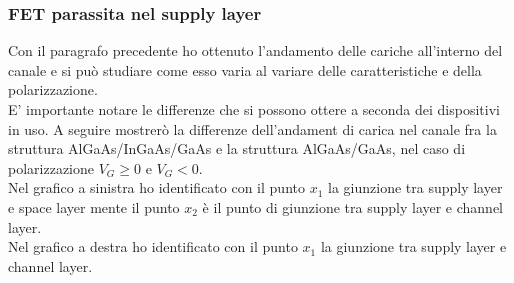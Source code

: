 \subsubsection{FET parassita nel supply layer}
Con il paragrafo precedente ho ottenuto l'andamento delle cariche all'interno del canale e si può studiare come esso varia al variare delle caratteristiche e della polarizzazione.\\
E' importante notare le differenze che si possono ottere a seconda dei dispositivi in uso. A seguire mostrerò la differenze dell'andament di carica nel canale fra la struttura AlGaAs/InGaAs/GaAs e la struttura AlGaAs/GaAs, nel caso di polarizzazione $V_G \geq 0$ e $V_G<0$.\\
Nel grafico a sinistra ho identificato con il punto $x_1$ la giunzione tra supply layer e space layer mente il punto $x_2$ è il punto di giunzione tra supply layer e channel layer.\\
Nel grafico a destra ho identificato con il punto $x_1$ la giunzione tra supply layer e channel layer.\\
%
\noindent\begin{minipage}{0.4\textwidth}
    \begin{center}
    \label{fig:enter-label}
\end{center}
\end{minipage}
